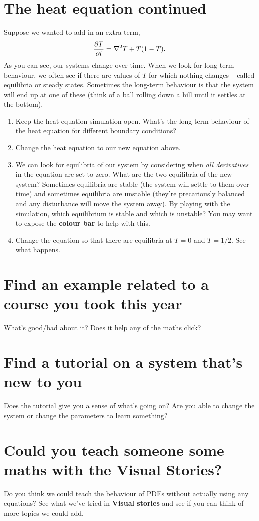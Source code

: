 \documentclass[a4paper,10pt]{article}
\begin{document}
\section{The heat equation continued}
Suppose we wanted to add in an extra term,
\[\pd{T}{t} = \nabla^2 T + T(1-T).\]
As you can see, our systems change over time. When we look for long-term behaviour, we often see if there are values of $T$ for which nothing changes -- called equilibria or steady states. Sometimes the long-term behaviour is that the system will end up at one of these (think of a ball rolling down a hill until it settles at the bottom).
\begin{enumerate}[label=(\alph*)]
    \item Keep the heat equation simulation open. What's the long-term behaviour of the heat equation for different boundary conditions?
    \item Change the heat equation to our new equation above.
    \item We can look for equilibria of our system by considering when \emph{all derivatives} in the equation are set to zero. What are the two equilibria of the new system? Sometimes equilibria are stable (the system will settle to them over time) and sometimes equilibria are unstable (they're precariously balanced and any disturbance will move the system away). By playing with the simulation, which equilibrium is stable and which is unstable? You may want to expose the \textbf{colour bar} to help with this.
    \item Change the equation so that there are equilibria at $T=0$ and $T=1/2$. See what happens.
\end{enumerate}

\section{Find an example related to a course you took this year}
What's good/bad about it? Does it help any of the maths click?

\section{Find a tutorial on a system that's new to you}
Does the tutorial give you a sense of what's going on? Are you able to change the system or change the parameters to learn something?

\section{Could you teach someone some maths with the Visual Stories?}
Do you think we could teach the behaviour of PDEs without actually using any equations? See what we've tried in \textbf{Visual stories} and see if you can think of more topics we could add.
\end{document}
